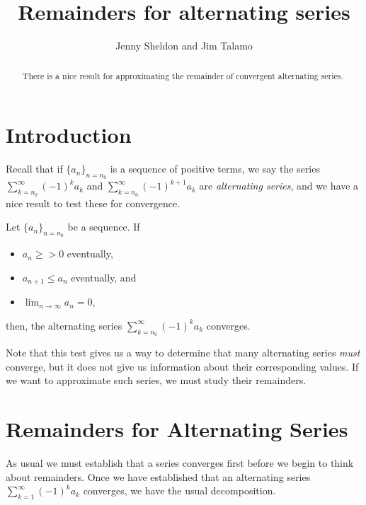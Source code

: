 \documentclass{ximera}
\title[Dig-In:]{Remainders for alternating series}
\author{Jenny Sheldon and Jim Talamo}
\begin{document}
\begin{abstract}
There is a nice result for approximating the remainder of convergent alternating series. 
\end{abstract}
\maketitle

\section{Introduction}
Recall that if $\{a_n\}_{n=n_0}$ is a sequence of positive terms, we say the series $\sum_{k=n_0}^{\infty} (-1)^k a_k$ and $\sum_{k=n_0}^{\infty} (-1)^{k+1} a_k$ are \emph{alternating series}, and we have a nice result to test these for convergence.

\begin{theorem}
Let $\{a_n\}_{n=n_0}$ be a sequence.  If

\begin{itemize}
\item $a_n \geq > 0$ eventually,
\item $a_{n+1} \leq a_n$ eventually, and
\item $\lim_{n \to\infty} a_n=0$, 
\end{itemize}

then, the alternating series $\sum_{k=n_0}^\infty (-1)^{k}a_k$ converges.
\end{theorem}


Note that this test gives us a way to determine that many alternating series \emph{must} converge, but it does not give us information about their corresponding values.  If we want to approximate such series, we must study their remainders.

  



\section{Remainders for Alternating Series}
As usual we must establish that a series converges first before we begin to think about remainders.  Once we have established that an alternating series $\sum_{k=1}^{\infty} (-1)^k a_k$ converges, we have the usual decomposition.

\begin{image}
  \end{image}
\end{document}
